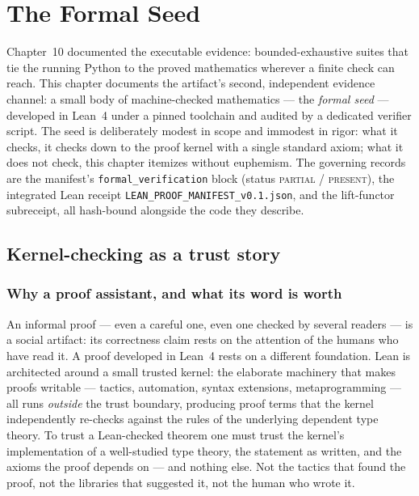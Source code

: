 \chapter{The Formal Seed}\label{ch11:lean}

Chapter~10 documented the executable evidence: bounded-exhaustive suites
that tie the running Python to the proved mathematics wherever a finite
check can reach. This chapter documents the artifact's second, independent
evidence channel: a small body of machine-checked mathematics --- the
\emph{formal seed} --- developed in Lean~4 under a pinned toolchain and
audited by a dedicated verifier script. The seed is deliberately modest in
scope and immodest in rigor: what it checks, it checks down to the proof
kernel with a single standard axiom; what it does not check, this chapter
itemizes without euphemism. The governing records are the manifest's
\texttt{formal\_verification} block (status \textsc{partial / present}),
the integrated Lean receipt \texttt{LEAN\_PROOF\_MANIFEST\_v0.1.json}, and
the lift-functor subreceipt, all hash-bound alongside the code they
describe.

\section{Kernel-checking as a trust story}\label{ch11:sec:trust}

\subsection{Why a proof assistant, and what its word is worth}

An informal proof --- even a careful one, even one checked by several
readers --- is a social artifact: its correctness claim rests on the
attention of the humans who have read it. A proof developed in Lean~4
\cite{lean4} rests on a different foundation. Lean is architected around a
small trusted kernel: the elaborate machinery that makes proofs writable
--- tactics, automation, syntax extensions, metaprogramming --- all runs
\emph{outside} the trust boundary, producing proof terms that the kernel
independently re-checks against the rules of the underlying dependent type
theory. To trust a Lean-checked theorem one must trust the kernel's
implementation of a well-studied type theory, the statement as written,
and the axioms the proof depends on --- and nothing else. Not the tactics
that found the proof, not the libraries that suggested it, not the human
who wrote it.

